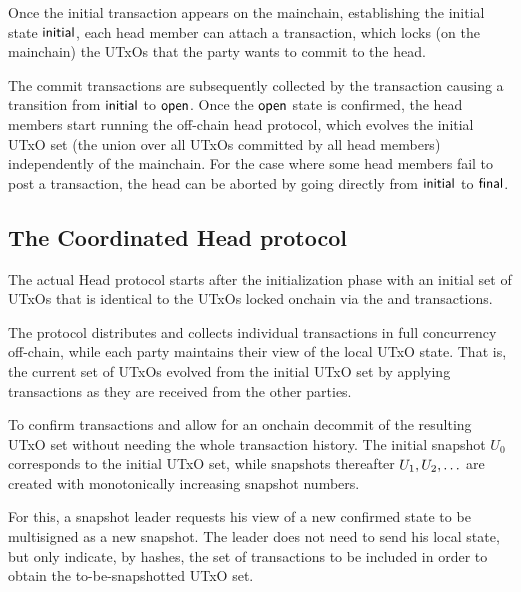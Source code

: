 

Once the initial transaction appears on the mainchain, establishing the initial
state $\mathsf{initial}$, each head member can attach a \mtxCom{} transaction, which
locks (on the mainchain) the UTxOs that the party wants to commit to the head.

The commit transactions are subsequently collected by the \mtxCCom{} transaction
causing a transition from $\mathsf{initial}$ to $\mathsf{open}$. Once the $\mathsf{open}$ state is
confirmed, the head members start running the off-chain head protocol, which
evolves the initial UTxO set (the union over all UTxOs committed by all head
members) independently of the mainchain. For the case where some head members
fail to post a \mtxCom{} transaction, the head can be aborted by going directly
from $\mathsf{initial}$ to $\mathsf{final}$. 

\subsection{The Coordinated Head protocol}

The actual Head protocol starts after the initialization phase with an initial
set of UTxOs that is identical to the UTxOs locked onchain via the \mtxCom{}
and \mtxCCom{} transactions.

The protocol distributes and collects individual transactions in full
concurrency off-chain, while each party maintains their view of the local UTxO
state. That is, the current set of UTxOs evolved from the initial UTxO set by
applying transactions as they are received from the other parties.

To confirm transactions and allow for an onchain decommit of the resulting UTxO
set without needing the whole transaction history. The initial snapshot $U_{0}$
corresponds to the initial UTxO set, while snapshots thereafter
$U_1,U_2,\ldots$  are created with monotonically increasing snapshot numbers.

For this, a snapshot leader  requests his view of a new confirmed state to be
multisigned as a new snapshot. The leader does not need to send his local state,
but only indicate, by hashes, the set of transactions to be included in order to
obtain the to-be-snapshotted UTxO set.

